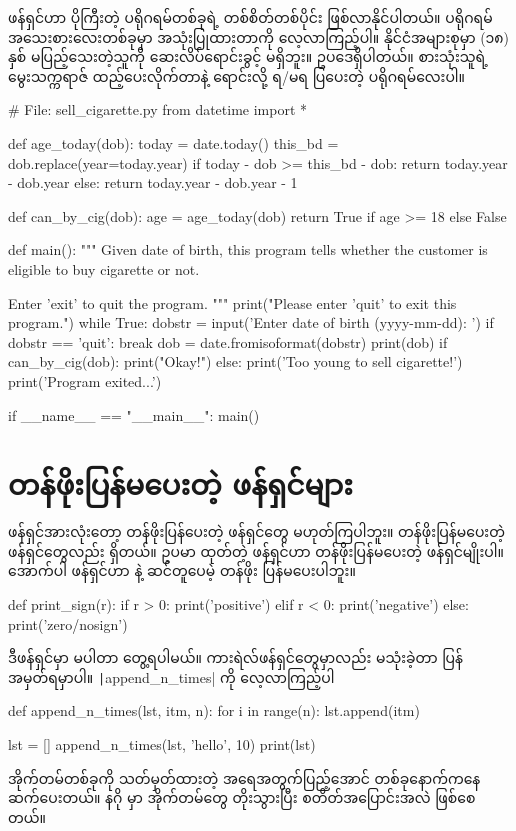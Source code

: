  ဖန်ရှင်ဟာ ပိုကြီးတဲ့ ပရိုဂရမ်တစ်ခုရဲ့ တစ်စိတ်တစ်ပိုင်း ဖြစ်လာနိုင်ပါတယ်။  ပရိုဂရမ် အသေးစားလေးတစ်ခုမှာ အသုံးပြုထားတာကို လေ့လာကြည့်ပါ။  နိုင်ငံအများစုမှာ (၁၈) နှစ် မပြည့်သေးတဲ့သူကို ဆေးလိပ်ရောင်းခွင့် မရှိဘူး။ ဥပဒေရှိပါတယ်။  စားသုံးသူရဲ့ မွေးသက္ကရာဇ် ထည့်ပေးလိုက်တာနဲ့ ရောင်းလို့ ရ/မရ ပြပေးတဲ့ ပရိုဂရမ်လေးပါ။ 
%
\begin{py}
# File: sell_cigarette.py
from datetime import *

def age_today(dob):
    today = date.today()
    this_bd = dob.replace(year=today.year)
    if today - dob >= this_bd - dob:
        return today.year - dob.year
    else:
        return today.year - dob.year - 1

def can_by_cig(dob):
    age = age_today(dob)
    return True if age >= 18 else False

def main():
    """
    Given date of birth, this program tells whether the customer
    is eligible to buy cigarette or not.

    Enter 'exit' to quit the program.
    """
    print("Please enter 'quit' to exit this program.")
    while True:
        dobstr = input('Enter date of birth (yyyy-mm-dd): ')
        if dobstr == 'quit': break
        dob = date.fromisoformat(dobstr)
        print(dob)
        if can_by_cig(dob):
            print("Okay!")
        else:
            print('Too young to sell cigarette!')
    print('Program exited...')


if __name__ == "__main__":
    main()
\end{py}
%


\section{တန်ဖိုးပြန်မပေးတဲ့ ဖန်ရှင်များ}
ဖန်ရှင်အားလုံးတော့ တန်ဖိုးပြန်ပေးတဲ့ ဖန်ရှင်တွေ မဟုတ်ကြပါဘူး။ တန်ဖိုးပြန်မပေးတဲ့ ဖန်ရှင်တွေလည်း ရှိတယ်။ ဥပမာ  ထုတ်တဲ့   ဖန်ရှင်ဟာ တန်ဖိုးပြန်မပေးတဲ့ ဖန်ရှင်မျိုးပါ။ အောက်ပါ  ဖန်ရှင်ဟာ  နဲ့ ဆင်တူပေမဲ့ တန်ဖိုး  ပြန်မပေးပါဘူး။ 
%
\begin{py}
def print_sign(r):
    if r > 0:
        print('positive')
    elif r < 0:
        print('negative')
    else:
        print('zero/nosign')
\end{py}
%
ဒီဖန်ရှင်မှာ  မပါတာ တွေ့ရပါမယ်။ ကားရဲလ်ဖန်ရှင်တွေမှာလည်း  မသုံးခဲ့တာ ပြန်အမှတ်ရမှာပါ။ \texttt|append_n_times| ကို လေ့လာကြည့်ပါ
%
\begin{py}
def append_n_times(lst, itm, n):
    for i in range(n):
        lst.append(itm)

lst = []
append_n_times(lst, 'hello', 10)
print(lst)
\end{py}
%
အိုက်တမ်တစ်ခုကို သတ်မှတ်ထားတဲ့ အရေအတွက်ပြည့်အောင်  တစ်ခုနောက်ကနေ ဆက်ပေးတယ်။ နဂို  မှာ အိုက်တမ်တွေ တိုးသွားပြီး စတိတ်အပြောင်းအလဲ ဖြစ်စေတယ်။

